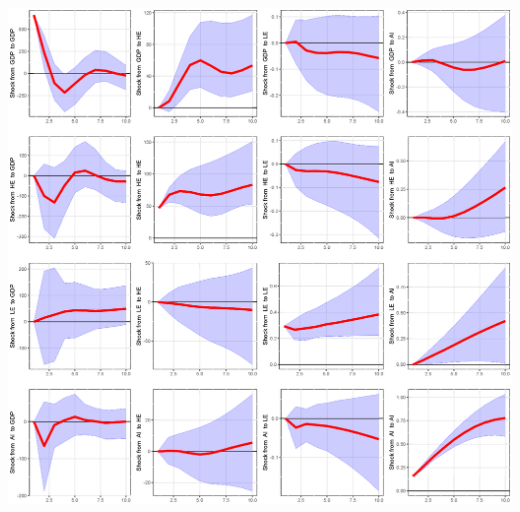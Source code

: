\documentclass[11pt,preprint, authoryear]{elsarticle}
\let\origfigure\figure
\let\endorigfigure\endfigure
\renewenvironment{figure}[1][2] {
    \expandafter\origfigure\expandafter[H]
} {
    \endorigfigure
}
\numberwithin{equation}{section}
\numberwithin{figure}{section}
\numberwithin{table}{section}
\begin{document}
\begin{figure}
  \centering
  \includegraphics[width=\textwidth]{irf_minnesota.eps}
  \caption{Minnesota prior: Impulse responses. Each plot shows the percentage-point response of the indicated variable from its steady state to a one-standard-deviation indicated shock when the Minnesota prior was adopted. Periods are in years. In the case of responses from GDP (growth) and HE, the responses are given as the percentage point times 100.}
  \label{irf_minnesota}
\end{figure}
\end{document}

